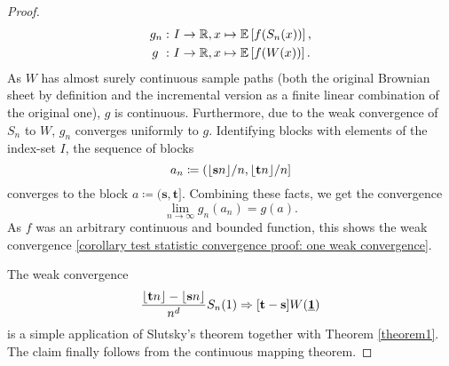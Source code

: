 \begin{proof}
    \begin{align*}
        g_n: \ & I \to \mathbb{R}, x \mapsto \mathbb{E}\left[f(S_n(x))\right], \\
        g\ :  \ & I \to \mathbb{R}, x \mapsto \mathbb{E}\left[f(W(x))\right].
    \end{align*}
    As $W$ has almost surely continuous sample paths (both the original Brownian sheet by definition and the incremental version as a finite linear combination of the original one), $g$ is continuous. Furthermore, due to the weak convergence of $S_n$ to $W$, $g_n$ converges uniformly to $g$.
    Identifying blocks with elements of the index-set $I$, the sequence of blocks 
    \[ a_n \coloneqq (\lfloor\mathbf{s} n\rfloor/n, \lfloor\mathbf{t} n\rfloor/n] \]
    converges to the block $a \coloneqq (\mathbf{s}, \mathbf{t}]$. Combining these facts, we get the convergence
    \[ \lim\limits_{n \to \infty} g_n(a_n) = g(a). \]
    As $f$ was an arbitrary continuous and bounded function, this shows the weak convergence \eqref{corollary test statistic convergence proof: one weak convergence}.
    
    The weak convergence 
    \[ \frac{\floor{\mathbf{t} n} - \floor{\mathbf{s} n }}{n^d} S_n(1) \Rightarrow [\mathbf{t} - \mathbf{s}] W(\usbf[1]) \]
    is a simple application of Slutsky's theorem together with Theorem \ref{theorem1}.
    The claim finally follows from the continuous mapping theorem.
\end{proof}

